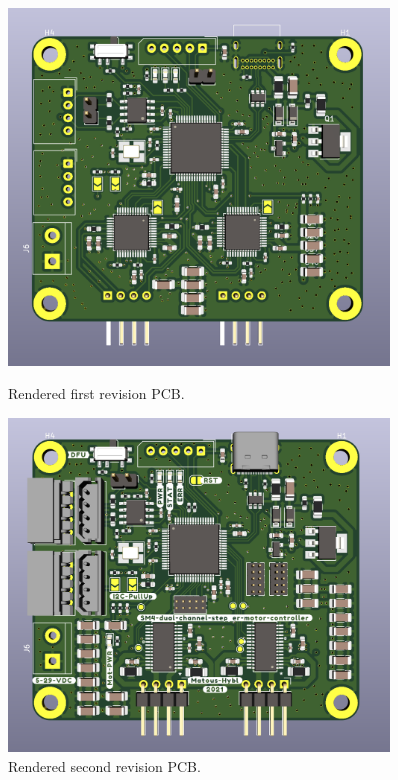 \begin{figure}[H]
    \begin{minipage}[t]{0.45\textwidth}
        \centering
        \includegraphics[width=0.9\textwidth]{obrazky/pcb_rev1}
        \caption{Rendered first revision PCB.}
        \label{fig:pcb1}
    \end{minipage}\hfill
    \begin{minipage}[t]{0.45\textwidth}
        \centering
        \includegraphics[width=0.9\textwidth]{obrazky/pcb_rev2}
        \caption{Rendered second revision PCB.}
        \label{fig:pcb2}
    \end{minipage}
\end{figure}
